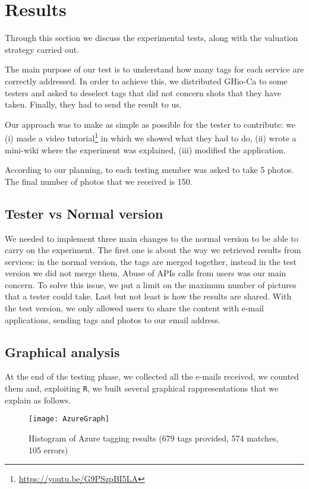 \section{Results}
\label{sec:results}

Through this section we discuss the experimental tests, along with the valuation 
strategy carried out. 

The main purpose of our test is to understand how many tags for each service are 
correctly addressed. In order to achieve this, we distributed GHio-Ca to some 
testers and asked to deselect tags that did not concern shots that they have 
taken. Finally, they had to send the result to us.

Our approach was to make as simple as possible for the tester to contribute: we 
(i) made a video tutorial\footnote{\url{https://youtu.be/G9PSzpBI5LA}} in which 
we showed what they had to do, (ii) wrote a mini-wiki where the experiment was 
explained, (iii) modified the application. 

According to our planning, to each testing member was asked to take 5 photos. 
The final number of photos that we received is 150.

\subsection{Tester vs Normal version}

We needed to implement three main changes to the normal version to be able to 
carry on the experiment. The first one is about the way we retrieved results 
from services: in the normal version, the tags are merged together, instead in 
the test version we did not merge them.
Abuse of APIs calls from users was our main concern. To solve this issue, we put 
a limit on the maximum number of pictures that a tester could take.
Last but not least is how the results are shared. With the test version, we only 
allowed users to share the content with e-mail applications, sending tags and 
photos to our email address.


\subsection{Graphical analysis}

At the end of the testing phase, we collected all the e-mails received, we 
counted them and, exploiting \texttt{R}, we built several graphical 
rappresentations that we explain as follows.

\begin{figure}[H]
\centering
\texttt{[image: AzureGraph]}
\caption{Histogram of Azure tagging results (679 tags provided, 574 matches, 105 
errors)}
\label{img:testgraphsazure}
\end{figure}

